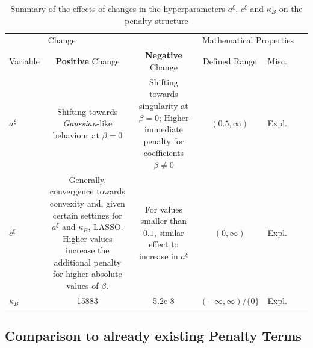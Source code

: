 \documentclass[12pt,a4paper]{article}
\begin{document}
\newpage
\begin{landscape}
\begin{table}[!h]
\begin{center}
\begin{tabular}{lcccccc}\toprule
		& \multicolumn{2}{l}{Change} & \multicolumn{3}{c}{Mathematical Properties}\\
		\cmidrule(r{4pt}){2-3} \cmidrule(l){4-5}
Variable     	& \textbf{Positive} Change  & \textbf{Negative} Change & Defined Range & Misc.\\\midrule
$a^\xi$  	& \makecell{Shifting towards\\ \textit{Gaussian}-like behaviour\\ at $\beta = 0$} & \makecell{Shifting towards singularity\\ at $\beta = 0$; Higher\\ immediate penalty for coefficients\\ $\beta \neq 0$} & $(0.5, \infty)$ & Expl.\\
$c^\xi$ 		& \makecell{Generally, convergence towards \\ convexity and, given certain \\ settings for $a^\xi$ and\\ $\kappa_B$, LASSO. Higher values\\ increase the additional penalty\\ for higher absolute values of $\beta$.} &  \makecell{For values smaller \\ than $0.1$, similar effect\\ to increase in $a^\xi$} & $(0, \infty)$ & Expl. \\
$\kappa_B$ 	& 15883 & 5.2e-8 & $(-\infty, \infty)/\{0\}$ & Expl. \\\bottomrule
\end{tabular}
\caption{Summary of the effects of changes in the hyperparameters $a^\xi$, $c^\xi$ and $\kappa_B$ on the penalty structure}
\label{tab:VariationsInHyperparameters}
\end{center}
\end{table}
\end{landscape}
\newpage

\subsection{Comparison to already existing Penalty Terms}\label{subsec:comparepenalties}
\end{document}
